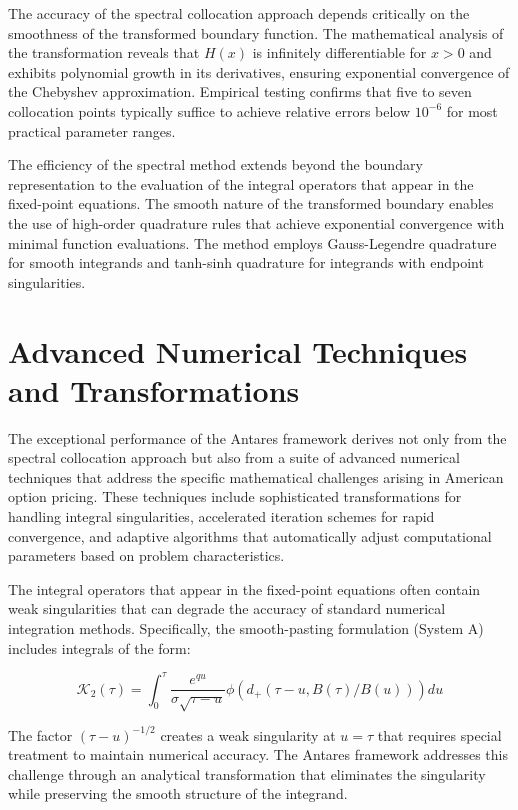 \documentclass[
  american,
  11pt,
  11pt,
  letterpaper,
  onecolumn]{article}
\begin{document}
The accuracy of the spectral collocation approach depends critically on
the smoothness of the transformed boundary function. The mathematical
analysis of the transformation reveals that \(H(x)\) is infinitely
differentiable for \(x > 0\) and exhibits polynomial growth in its
derivatives, ensuring exponential convergence of the Chebyshev
approximation. Empirical testing confirms that five to seven collocation
points typically suffice to achieve relative errors below \(10^{-6}\)
for most practical parameter ranges.

The efficiency of the spectral method extends beyond the boundary
representation to the evaluation of the integral operators that appear
in the fixed-point equations. The smooth nature of the transformed
boundary enables the use of high-order quadrature rules that achieve
exponential convergence with minimal function evaluations. The method
employs Gauss-Legendre quadrature for smooth integrands and tanh-sinh
quadrature for integrands with endpoint singularities.

\section{Advanced Numerical Techniques and
Transformations}\label{advanced-numerical-techniques-and-transformations}

The exceptional performance of the Antares framework derives not only
from the spectral collocation approach but also from a suite of advanced
numerical techniques that address the specific mathematical challenges
arising in American option pricing. These techniques include
sophisticated transformations for handling integral singularities,
accelerated iteration schemes for rapid convergence, and adaptive
algorithms that automatically adjust computational parameters based on
problem characteristics.

The integral operators that appear in the fixed-point equations often
contain weak singularities that can degrade the accuracy of standard
numerical integration methods. Specifically, the smooth-pasting
formulation (System A) includes integrals of the form:

\[\mathcal{K}_2(\tau) = \int_{0}^{\tau} \frac{e^{qu}}{\sigma\sqrt{\tau-u}} \phi(d_+(\tau-u, B(\tau)/B(u))) du\]

The factor \((\tau-u)^{-1/2}\) creates a weak singularity at
\(u = \tau\) that requires special treatment to maintain numerical
accuracy. The Antares framework addresses this challenge through an
analytical transformation that eliminates the singularity while
preserving the smooth structure of the integrand.
\end{document}
